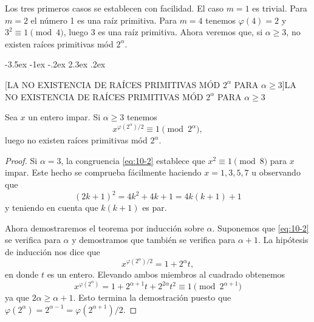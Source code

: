 \documentclass[12pt,a4paper]{book}
\makeatletter
\renewcommand\section{\@startsection{section}{1}{\z@}%
  {-3.5ex \@plus -1ex \@minus -.2ex}%
  {2.3ex \@plus .2ex}%
  {\normalfont\Large\bfseries\raggedright}}
\makeatother
\begin{document}
    Los tres primeros casos se establecen con facilidad. El caso $m=1$ es trivial. Para
    $m=2$ el número 1 es una raíz primitiva. Para $m=4$ tenemos $\varphi(4)=2$ y
    $3^{2}\equiv1\pmod{4}$, luego 3 es una raíz primitiva. Ahora veremos que, si
    $\alpha\geq3$, no existen raíces primitivas mód $2^{\alpha}$.

    \section[LA NO EXISTENCIA DE RAÍCES PRIMITIVAS MÓD \texorpdfstring{$2^{\alpha}$}{2\textasciicircum{}α} PARA \texorpdfstring{$\alpha\geq3$}{α≥3}]{LA NO EXISTENCIA DE RAÍCES PRIMITIVAS MÓD \texorpdfstring{$2^{\alpha}$}{2\textasciicircum{}α} PARA \texorpdfstring{$\alpha\geq3$}{α≥3}}
    \begin{teorema}\label{teo:10-3}
        Sea $x$ un entero impar. Si $\alpha\geq3$ tenemos
        \begin{equation}\label{eq:10-2}
            x^{\varphi(2^{\alpha})/2}\equiv1\pmod{2^{\alpha}},
        \end{equation}
        luego no existen raíces primitivas mód $2^{\alpha}$.
    \end{teorema}

    \begin{proof}
        Si $\alpha=3$, la congruencia \eqref{eq:10-2} establece que $x^{2}\equiv1\pmod{8}$
        para $x$ impar. Este hecho se comprueba fácilmente haciendo $x=1,3,5,7$ u
        observando que
        \begin{equation*}
            (2k+1)^{2}=4k^{2}+4k+1=4k(k+1)+1
        \end{equation*}
        y teniendo en cuenta que $k(k+1)$ es par.

        Ahora demostraremos el teorema por inducción sobre $\alpha$. Suponemos que
        \eqref{eq:10-2} se verifica para $\alpha$ y demostramos que también se verifica para
        $\alpha+1$. La hipótesis de inducción nos dice que
        \begin{equation*}
            x^{\varphi(2^{\alpha})/2}=1+2^{\alpha}t,
        \end{equation*}
        en donde $t$ es un entero. Elevando ambos miembros al cuadrado obtenemos
        \begin{equation*}
            x^{\varphi(2^{\alpha})}=1+2^{\alpha+1}t+2^{2\alpha}t^{2}\equiv1\pmod{2^{\alpha+1}}
        \end{equation*}
        ya que $2\alpha\geq\alpha+1$. Esto termina la demostración puesto que
        $\varphi(2^{\alpha})=2^{\alpha-1}=\varphi(2^{\alpha+1})/2$.
    \end{proof}
\end{document}
